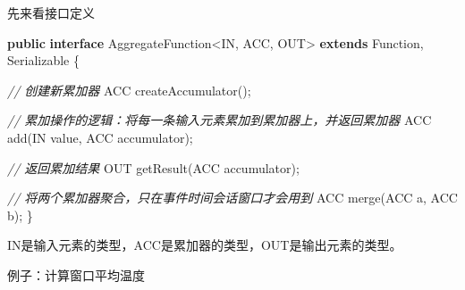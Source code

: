 \documentclass[cn,11pt,chinese]{elegantbook}
\newenvironment{Shaded}{}{}
\newcommand{\BuiltInTok}[1]{#1}
\newcommand{\CommentTok}[1]{\textcolor[rgb]{0.38,0.63,0.69}{\textit{#1}}}
\newcommand{\FunctionTok}[1]{\textcolor[rgb]{0.02,0.16,0.49}{#1}}
\newcommand{\KeywordTok}[1]{\textcolor[rgb]{0.00,0.44,0.13}{\textbf{#1}}}
\newcommand{\NormalTok}[1]{#1}
\begin{document}
先来看接口定义

\begin{Shaded}
\begin{Highlighting}[]
\KeywordTok{public} \KeywordTok{interface}\NormalTok{ AggregateFunction\textless{}IN, ACC, OUT\textgreater{} }\KeywordTok{extends}\NormalTok{ Function, }\BuiltInTok{Serializable}\NormalTok{ \{}

  \CommentTok{// 创建新累加器}
\NormalTok{  ACC }\FunctionTok{createAccumulator}\NormalTok{();}

  \CommentTok{// 累加操作的逻辑：将每一条输入元素累加到累加器上，并返回累加器}
\NormalTok{  ACC }\FunctionTok{add}\NormalTok{(IN value, ACC accumulator);}

  \CommentTok{// 返回累加结果}
\NormalTok{  OUT }\FunctionTok{getResult}\NormalTok{(ACC accumulator);}

  \CommentTok{// 将两个累加器聚合，只在事件时间会话窗口才会用到}
\NormalTok{  ACC }\FunctionTok{merge}\NormalTok{(ACC a, ACC b);}
\NormalTok{\}}
\end{Highlighting}
\end{Shaded}

IN是输入元素的类型，ACC是累加器的类型，OUT是输出元素的类型。

例子：计算窗口平均温度
\end{document}
